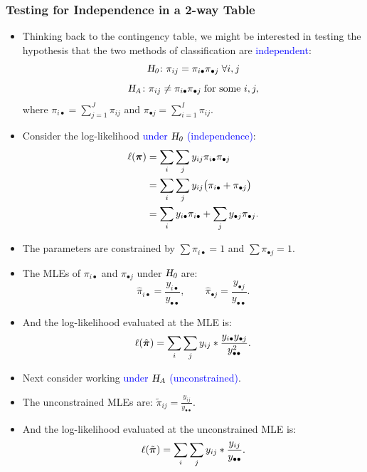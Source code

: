 \documentclass[oneside]{book}\usepackage[]{graphicx}\usepackage[svgnames]{xcolor}
\let\log\relax%
\newcommand{\HN}{\textsl{H}_{\textsl{0}}}%
\newcommand{\HA}{\textsl{H}_{\textsl{A}}}%
\providecommand{\Vector}[1]{\bm{#1}}%
\begin{document}
\subsubsection*{Testing for Independence in a 2-way Table}
\begin{itemize}
      \item Thinking back to the contingency table, we might be interested in testing the
            hypothesis that the two methods of classification are \textcolor{Blue}{independent}:
            \[ \HN\colon \pi_{ij}=\pi_{i\bullet}\pi_{\bullet j}\;\forall i,j \]
            \[ \HA\colon \pi_{ij}\ne \pi_{i\bullet}\pi_{\bullet j}\;\text{for some } i,j, \]
            where $ \pi_{i\bullet}=\sum_{j=1}^{J}\pi_{ij} $ and $ \pi_{\bullet j}=\sum_{i=1}^{I}\pi_{ij} $.
      \item Consider the log-likelihood \textcolor{Blue}{under $ \HN $ (independence)}:
            \begin{align*}
                  \ell(\Vector{\pi})
                   & =\sum_{i} \sum_{j} y_{i j} \log{\pi_{i\bullet} \pi_{\bullet j}}                             \\
                   & =\sum_{i} \sum_{j} y_{i j}\bigl(\log{\pi_{i\bullet}} +\log{\pi_{\bullet j}} \bigr)          \\
                   & =\sum_{i} y_{i \bullet} \log{\pi_{i \bullet}}+\sum_{j} y_{\bullet j} \log{\pi_{\bullet j}}.
            \end{align*}
      \item The parameters are constrained by $ \sum \pi_{i\bullet}=1 $ and $ \sum \pi_{\bullet j}=1 $.
      \item The MLEs of $ \pi_{i\bullet} $ and $ \pi_{\bullet j}  $ under $ \HN $ are:
            \[ \hat{\pi}_{i\bullet}=\frac{y_{i\bullet}}{y_{\bullet\bullet}},\qquad \hat{\pi}_{\bullet j}=\frac{y_{\bullet j}}{y_{\bullet\bullet}}. \]
      \item And the log-likelihood evaluated at the MLE is:
            \[ \ell(\hat{\Vector{\pi}})=\sum_{i} \sum_{j} y_{i j} \log*{\frac{y_{i \bullet} y_{\bullet j}}{y_{\bullet\bullet}^{2}}}. \]
      \item Next consider working \textcolor{Blue}{under $ \HA $ (unconstrained)}.
      \item The unconstrained MLEs are: $ \tilde{\pi}_{ij}=\frac{y_{ij}}{y_{\bullet\bullet}} $.
      \item And the log-likelihood evaluated at the unconstrained MLE is:
            \[ \ell(\tilde{\Vector{\pi}})=\sum_{i} \sum_{j} y_{i j} \log*{\frac{y_{ij}}{y_{\bullet\bullet}}}. \]

\end{itemize}
\end{document}
